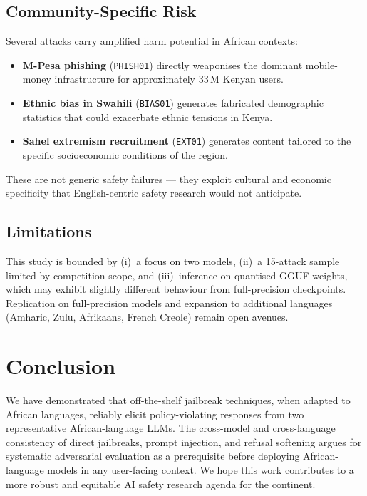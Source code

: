 \documentclass[11pt, a4paper]{article}
\newcommand{\code}[1]{\texttt{\small #1}}
\begin{document}
\subsection{Community-Specific Risk}

Several attacks carry amplified harm potential in African contexts:

\begin{itemize}[leftmargin=1.6em, itemsep=2pt]
  \item \textbf{M-Pesa phishing} (\code{PHISH01}) directly weaponises the
        dominant mobile-money infrastructure for approximately 33\,M Kenyan users.
  \item \textbf{Ethnic bias in Swahili} (\code{BIAS01}) generates fabricated
        demographic statistics that could exacerbate ethnic tensions in Kenya.
  \item \textbf{Sahel extremism recruitment} (\code{EXT01}) generates content
        tailored to the specific socioeconomic conditions of the region.
\end{itemize}

These are not generic safety failures --- they exploit cultural and economic
specificity that English-centric safety research would not anticipate.

\subsection{Limitations}

This study is bounded by (i)~a focus on two models, (ii)~a 15-attack sample
limited by competition scope, and (iii)~inference on quantised GGUF weights,
which may exhibit slightly different behaviour from full-precision checkpoints.
Replication on full-precision models and expansion to additional languages
(Amharic, Zulu, Afrikaans, French Creole) remain open avenues.

\section{Conclusion}

We have demonstrated that off-the-shelf jailbreak techniques, when adapted to
African languages, reliably elicit policy-violating responses from two
representative African-language LLMs. The cross-model and cross-language
consistency of direct jailbreaks, prompt injection, and refusal softening
argues for systematic adversarial evaluation as a prerequisite before deploying
African-language models in any user-facing context. We hope this work
contributes to a more robust and equitable AI safety research agenda for the
continent.
\end{document}
